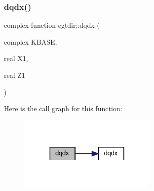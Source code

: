 \subsubsection{\texorpdfstring{dqdx()}{dqdx()}}
{\footnotesize\ttfamily complex function egtdir\+::dqdx (\begin{DoxyParamCaption}\item[{complex}]{K\+B\+A\+SE,  }\item[{real}]{X1,  }\item[{real}]{Z1 }\end{DoxyParamCaption})}

Here is the call graph for this function\+:\nopagebreak
\begin{figure}[H]
\begin{center}
\leavevmode
\includegraphics[width=192pt]{Leroi__c_8f90_a0dd58336077baa8c233cc4d08cc10939_cgraph}
\end{center}
\end{figure}
\mbox{\label{Leroi__c_8f90_a2ffa10f72b064e2c52fb28da1b335098}} 
